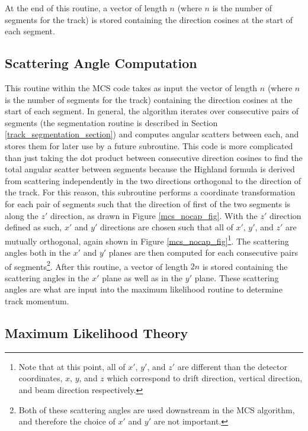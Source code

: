 At the end of this routine, a vector of length $n$ (where $n$ is the number of segments for the track) is stored containing the direction cosines at the start of each segment.


\subsection{Scattering Angle Computation}\label{scattering_angle_computation_section}
This routine within the MCS code takes as input the vector of length $n$ (where $n$ is the number of segments for the track) containing the direction cosines at the start of each segment. In general, the algorithm iterates over consecutive pairs of segments (the segmentation routine is described in Section \ref{track_segmentation_section}) and computes angular scatters between each, and stores them for later use by a future subroutine. This code is more complicated than just taking the dot product between consecutive direction cosines to find the total angular scatter between segments because the Highland formula is derived from scattering independently in the two directions orthogonal to the direction of the track. For this reason, this subroutine performs a coordinate transformation for each pair of segments such that the direction of first of the two segments is along the $z'$ direction, as drawn in Figure \ref{mcs_nocap_fig}. With the $z'$ direction defined as such, $x'$ and $y'$ directions are chosen such that all of $x'$, $y'$, and $z'$ are mutually orthogonal, again shown in Figure \ref{mcs_nocap_fig}\footnote{Note that at this point, all of $x'$, $y'$, and $z'$ are different than the detector coordinates, $x$, $y$, and $z$ which correspond to drift direction, vertical direction, and beam direction respectively.}. The scattering angles both in the $x'$ and $y'$ planes are then computed for each consecutive pairs of segments\footnote{Both of these scattering angles are used downstream in the MCS algorithm, and therefore the choice of $x'$ and $y'$ are not important.}. After this routine, a vector of length $2n$ is stored containing the scattering angles in the $x'$ plane as well as in the $y'$ plane. These scattering angles are what are input into the maximum likelihood routine to determine track momentum.


\subsection{Maximum Likelihood Theory}\label{likelihood_theory_section}


